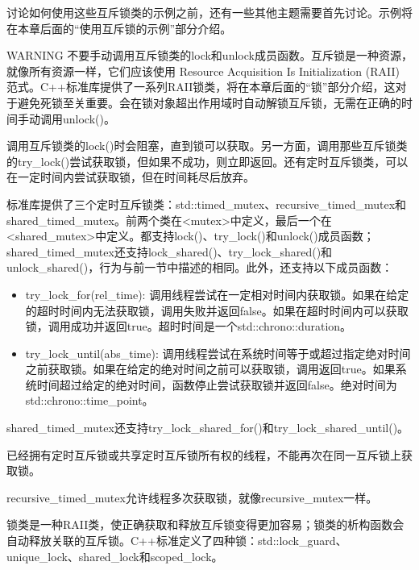 讨论如何使用这些互斥锁类的示例之前，还有一些其他主题需要首先讨论。示例将在本章后面的“使用互斥锁的示例”部分介绍。

\begin{myWarning}{WARNING}
不要手动调用互斥锁类的lock和unlock成员函数。互斥锁是一种资源，就像所有资源一样，它们应该使用 Resource Acquisition Is Initialization (RAII) 范式。C++标准库提供了一系列RAII锁类，将在本章后面的“锁”部分介绍，这对于避免死锁至关重要。会在锁对象超出作用域时自动解锁互斥锁，无需在正确的时间手动调用unlock()。
\end{myWarning}


调用互斥锁类的lock()时会阻塞，直到锁可以获取。另一方面，调用那些互斥锁类的try\_lock()尝试获取锁，但如果不成功，则立即返回。还有定时互斥锁类，可以在一定时间内尝试获取锁，但在时间耗尽后放弃。

标准库提供了三个定时互斥锁类：std::timed\_mutex、recursive\_timed\_mutex和shared\_timed\_mutex。前两个类在<mutex>中定义，最后一个在<shared\_mutex>中定义。都支持lock()、try\_lock()和unlock()成员函数；shared\_timed\_mutex还支持lock\_shared()、try\_lock\_shared()和unlock\_shared()，行为与前一节中描述的相同。此外，还支持以下成员函数：

\begin{itemize}
\item
try\_lock\_for(rel\_time): 调用线程尝试在一定相对时间内获取锁。如果在给定的超时时间内无法获取锁，调用失败并返回false。如果在超时时间内可以获取锁，调用成功并返回true。超时时间是一个std::chrono::duration。

\item
try\_lock\_until(abs\_time): 调用线程尝试在系统时间等于或超过指定绝对时间之前获取锁。如果在给定的绝对时间之前可以获取锁，调用返回true。如果系统时间超过给定的绝对时间，函数停止尝试获取锁并返回false。绝对时间为std::chrono::time\_point。
\end{itemize}

shared\_timed\_mutex还支持try\_lock\_shared\_for()和try\_lock\_shared\_until()。

已经拥有定时互斥锁或共享定时互斥锁所有权的线程，不能再次在同一互斥锁上获取锁。

recursive\_timed\_mutex允许线程多次获取锁，就像recursive\_mutex一样。


锁类是一种RAII类，使正确获取和释放互斥锁变得更加容易；锁类的析构函数会自动释放关联的互斥锁。C++标准定义了四种锁：std::lock\_guard、unique\_lock、shared\_lock和scoped\_lock。

